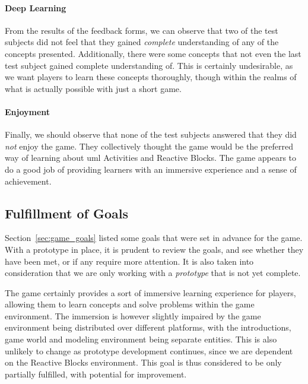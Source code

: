 \paragraph{Deep Learning} From the results of the feedback forms, we can observe that two of the test subjects did not feel that they gained \emph{complete} understanding of any of the concepts presented. Additionally, there were some concepts that not even the last test subject gained complete understanding of. This is certainly undesirable, as we want players to learn these concepts thoroughly, though within the realms of what is actually possible with just a short game.

\paragraph{Enjoyment} Finally, we should observe that none of the test subjects answered that they did \emph{not} enjoy the game. They collectively thought the game would be the preferred way of learning about \gls{uml} Activities and Reactive Blocks. The game appears to do a good job of providing learners with an immersive experience and a sense of achievement.

\subsection{Fulfillment of Goals}
\label{sec:game_goal_fulfillment}
Section~\ref{sec:game_goals} listed some goals that were set in advance for the game. With a prototype in place, it is prudent to review the goals, and see whether they have been met, or if any require more attention. It is also taken into consideration that we are only working with a \emph{prototype} that is not yet complete.

\noindent
The game certainly provides a sort of immersive learning experience for players, allowing them to learn concepts and solve problems within the game environment. The immersion is however slightly impaired by the game environment being distributed over different platforms, with the introductions, game world and modeling environment being separate entities. This is also unlikely to change as prototype development continues, since we are dependent on the Reactive Blocks environment. This goal is thus considered to be only partially fulfilled, with potential for improvement.

